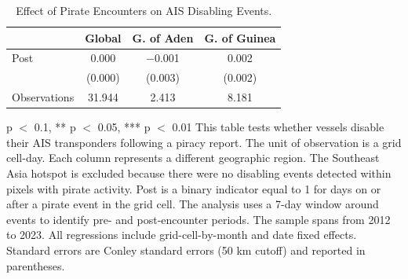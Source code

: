 \begin{table}
\centering
\caption{Effect of Pirate Encounters on AIS Disabling Events. \label{tab:ais-disabling_rev1}}
\centering
\begin{threeparttable}
\begin{tabular}[t]{lccc}
\toprule
  & Global & G. of Aden & G. of Guinea\\
\midrule
Post & \num{0.000} & \num{-0.001} & \num{0.002}\\
 & (\num{0.000}) & (\num{0.003}) & (\num{0.002})\\
\midrule
Observations & \num{31,944} & \num{2,413} & \num{8,181}\\
\bottomrule
\end{tabular}
\begin{tablenotes}
\item \scriptsize * p $<$ 0.1, ** p $<$ 0.05, *** p $<$ 0.01 This table tests whether vessels disable their AIS transponders following a piracy report. The unit of observation is a grid cell-day. Each column represents a different geographic region. The Southeast Asia hotspot is excluded because there were no disabling events detected within pixels with pirate activity. Post is a binary indicator equal to 1 for days on or after a pirate event in the grid cell. The analysis uses a 7-day window around events to identify pre- and post-encounter periods. The sample spans from 2012 to 2023. All regressions include grid-cell-by-month and date fixed effects. Standard errors are Conley standard errors (50 km cutoff) and reported in parentheses.
\end{tablenotes}
\end{threeparttable}
\end{table}
